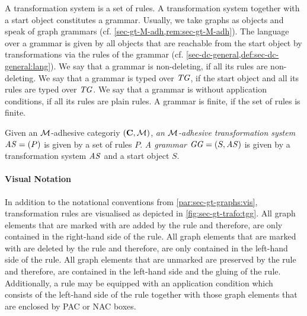 A transformation system is a set of rules.
A transformation system together with a start object constitutes a grammar.
Usually, we take graphs as objects and speak of graph grammars (cf. \cref{sec-gt-M-adh,rem:sec-gt-M-adh}).
The language over a grammar is given by all objects that are reachable from the start object by transformations via the rules of the grammar (cf. \cref{sec-dc-general,def:sec-dc-general:lang}).
We say that a grammar is non-deleting, if all its rules are non-deleting.
We say that a grammar is typed over $\mathit{TG}$, if the start object and all its rules are typed over $\mathit{TG}$.
We say that a grammar is without application conditions, if all its rules are plain rules.
A grammar is finite, if the set of rules is finite.

\begin{definition}
\label{def:sec-gt-trafo:grammar}
Given an ${\cal M}$-adhesive categoriy $(\mathbf{C},{\cal M})$, \emph{an ${\cal M}$-adhesive transformation system $\mathit{AS}=(P)$} is given by a set of rules $P$.
\emph{A grammar $\mathit{GG}=(S,\mathit{AS})$} is given by a transformation system $\mathit{AS}$ and a start object $S$.
\envEndMarker
\end{definition}

\paragraph*{Visual Notation}
\label{par:sec-gt-trafo:vis_not}
In addition to the notational conventions from \cref{par:sec-gt-graphs:vis}, transformation rules are visualised as depicted in \cref{fig:sec-gt-trafo:tgg}.
All graph elements that are marked with \code{++} are added by the rule and therefore, are only contained in the right-hand side of the rule.
All graph elements that are marked with \code{--} are deleted by the rule and therefore, are only contained in the left-hand side of the rule.
All graph elements that are unmarked are preserved by the rule and therefore, are contained in the left-hand side and the gluing of the rule.
Additionally, a rule may be equipped with an application condition which consists of the left-hand side of the rule together with those graph elements that are enclosed by PAC or NAC boxes.

